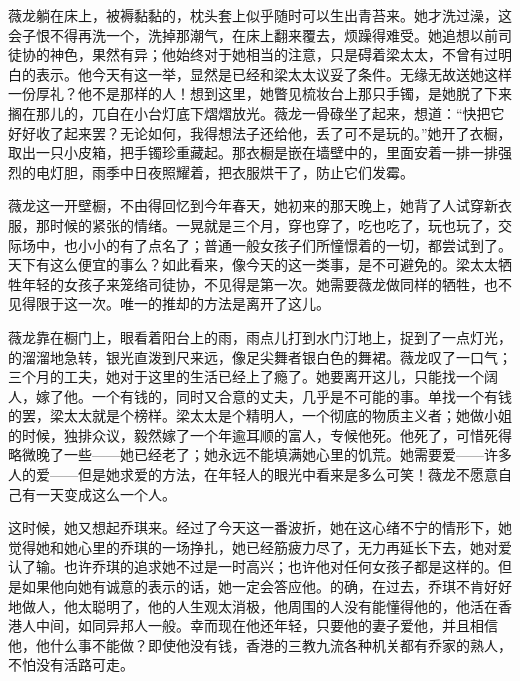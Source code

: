 \par 薇龙躺在床上，被褥黏黏的，枕头套上似乎随时可以生出青苔来。她才洗过澡，这会子恨不得再洗一个，洗掉那潮气，在床上翻来覆去，烦躁得难受。她追想以前司徒协的神色，果然有异；他始终对于她相当的注意，只是碍着梁太太，不曾有过明白的表示。他今天有这一举，显然是已经和梁太太议妥了条件。无缘无故送她这样一份厚礼？他不是那样的人！想到这里，她瞥见梳妆台上那只手镯，是她脱了下来搁在那儿的，兀自在小台灯底下熠熠放光。薇龙一骨碌坐了起来，想道：“快把它好好收了起来罢？无论如何，我得想法子还给他，丢了可不是玩的。”她开了衣橱，取出一只小皮箱，把手镯珍重藏起。那衣橱是嵌在墙壁中的，里面安着一排一排强烈的电灯胆，雨季中日夜照耀着，把衣服烘干了，防止它们发霉。
\par 薇龙这一开壁橱，不由得回忆到今年春天，她初来的那天晚上，她背了人试穿新衣服，那时候的紧张的情绪。一晃就是三个月，穿也穿了，吃也吃了，玩也玩了，交际场中，也小小的有了点名了；普通一般女孩子们所憧憬着的一切，都尝试到了。天下有这么便宜的事么？如此看来，像今天的这一类事，是不可避免的。梁太太牺牲年轻的女孩子来笼络司徒协，不见得是第一次。她需要薇龙做同样的牺牲，也不见得限于这一次。唯一的推却的方法是离开了这儿。
\par 薇龙靠在橱门上，眼看着阳台上的雨，雨点儿打到水门汀地上，捉到了一点灯光，的溜溜地急转，银光直泼到尺来远，像足尖舞者银白色的舞裙。薇龙叹了一口气；三个月的工夫，她对于这里的生活已经上了瘾了。她要离开这儿，只能找一个阔人，嫁了他。一个有钱的，同时又合意的丈夫，几乎是不可能的事。单找一个有钱的罢，梁太太就是个榜样。梁太太是个精明人，一个彻底的物质主义者；她做小姐的时候，独排众议，毅然嫁了一个年逾耳顺的富人，专候他死。他死了，可惜死得略微晚了一些——她已经老了；她永远不能填满她心里的饥荒。她需要爱——许多人的爱——但是她求爱的方法，在年轻人的眼光中看来是多么可笑！薇龙不愿意自己有一天变成这么一个人。
\par 这时候，她又想起乔琪来。经过了今天这一番波折，她在这心绪不宁的情形下，她觉得她和她心里的乔琪的一场挣扎，她已经筋疲力尽了，无力再延长下去，她对爱认了输。也许乔琪的追求她不过是一时高兴；也许他对任何女孩子都是这样的。但是如果他向她有诚意的表示的话，她一定会答应他。的确，在过去，乔琪不肯好好地做人，他太聪明了，他的人生观太消极，他周围的人没有能懂得他的，他活在香港人中间，如同异邦人一般。幸而现在他还年轻，只要他的妻子爱他，并且相信他，他什么事不能做？即使他没有钱，香港的三教九流各种机关都有乔家的熟人，不怕没有活路可走。

